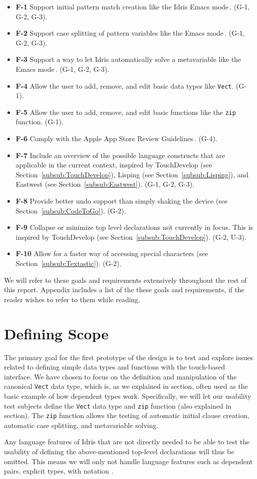 \begin{itemize}
	\item \textbf{F-1} Support initial pattern match creation like the Idris Emacs mode\,\cite{Idris:EmacsMode}. (G-1, G-2, G-3).
	\item \textbf{F-2} Support case splitting of pattern variables like the Emacs mode\,\cite{Idris:EmacsMode}. (G-1, G-2, G-3).
	\item \textbf{F-3} Support a way to let Idris automatically solve a metavariable like the Emacs mode\,\cite{Idris:EmacsMode}. (G-1, G-2, G-3).
	\item \textbf{F-4} Allow the user to add, remove, and edit basic data types like \texttt{Vect}. (G-1).
	\item \textbf{F-5} Allow the user to add, remove, and edit basic functions like the \texttt{zip} function. (G-1).
	\item \textbf{F-6} Comply with the Apple App Store Review Guidelines\,\cite{AppStoreGuidelines}. (G-4).
	\item \textbf{F-7} Include an overview of the possible language constructs that are	applicable in the current context, inspired by TouchDevelop (see Section~\ref{subsub:TouchDevelop}), Lisping (see Section~\ref{subsub:Lisping}), and Eastwest (see Section~\ref{subsub:Eastwest}). (G-1, G-2, G-3).
	\item \textbf{F-8} Provide better undo support than simply shaking the device (see Section~\ref{subsub:CodeToGo}). (G-2).
	\item \textbf{F-9} Collapse or minimize top level declarations not currently in focus. This is inspired by TouchDevelop	(see Section~\ref{subsub:TouchDevelop}). (G-2, U-3).
	\item \textbf{F-10} Allow for a faster way of accessing special characters (see Section~\ref{subsub:Textastic}). (G-2).
\end{itemize}

We will refer to these goals and requirements extensively throughout the rest of this report. Appendix includes a list of the these goals and requirements, if the reader wishes to refer to them while reading.

\section{Defining Scope} 
\label{sec:defining_scope}
The primary goal for the first prototype of the design is to test and explore
issues related to defining simple data types and functions with the touch-based interface. 
We have chosen to focus on the definition and manipulation of the canonical \texttt{Vect} data type, which is, as we explained in section, often used as the basic example of how dependent types work.
Specifically, we will let our usability test subjects define the \texttt{Vect} data type and \texttt{zip} function (also explained in section).
The \texttt{zip} function allows the testing of automatic initial clause creation, automatic case splitting, and metavariable solving.

Any language features of Idris that are not directly needed to be able to test the usability of defining the above-mentioned top-level declarations will thus be omitted. This means we will only not handle language features such as dependent pairs, explicit types, with notation .
